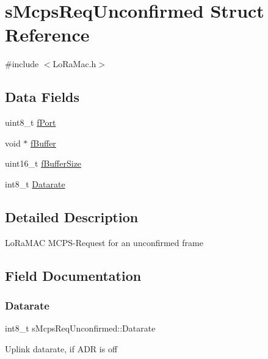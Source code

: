 \hypertarget{structsMcpsReqUnconfirmed}{}\section{s\+Mcps\+Req\+Unconfirmed Struct Reference}
\label{structsMcpsReqUnconfirmed}


{\ttfamily \#include $<$Lo\+Ra\+Mac.\+h$>$}

\subsection*{Data Fields}
\begin{DoxyCompactItemize}
\item 
uint8\+\_\+t \hyperlink{structsMcpsReqUnconfirmed_a3c0190f7a5cc179b8cd664ff6a57169e}{f\+Port}
\item 
void $\ast$ \hyperlink{structsMcpsReqUnconfirmed_a38fff2f3a5d07612c80146613fe86ceb}{f\+Buffer}
\item 
uint16\+\_\+t \hyperlink{structsMcpsReqUnconfirmed_a0e3cfa4780e696a8e262d1f8f9f5fec4}{f\+Buffer\+Size}
\item 
int8\+\_\+t \hyperlink{structsMcpsReqUnconfirmed_a4df8871b15c859e010df754c419c5cb5}{Datarate}
\end{DoxyCompactItemize}


\subsection{Detailed Description}
Lo\+Ra\+M\+AC M\+C\+P\+S-\/\+Request for an unconfirmed frame 

\subsection{Field Documentation}
\mbox{\label{structsMcpsReqUnconfirmed_a4df8871b15c859e010df754c419c5cb5}} 
\subsubsection{\texorpdfstring{Datarate}{Datarate}}
{\footnotesize\ttfamily int8\+\_\+t s\+Mcps\+Req\+Unconfirmed\+::\+Datarate}

Uplink datarate, if A\+DR is off \mbox{\label{structsMcpsReqUnconfirmed_a38fff2f3a5d07612c80146613fe86ceb}} 
